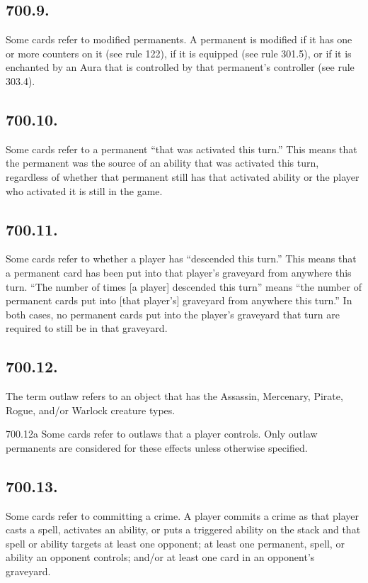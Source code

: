 \subsection*{700.9.}
Some cards refer to modified permanents. A permanent is modified if it has one or more counters on it (see rule 122), if it is equipped (see rule 301.5), or if it is enchanted by an Aura that is controlled by that permanent’s controller (see rule 303.4).

\subsection*{700.10.}
Some cards refer to a permanent “that was activated this turn.” This means that the permanent was the source of an ability that was activated this turn, regardless of whether that permanent still has that activated ability or the player who activated it is still in the game.

\subsection*{700.11.}
Some cards refer to whether a player has “descended this turn.” This means that a permanent card has been put into that player’s graveyard from anywhere this turn. “The number of times [a player] descended this turn” means “the number of permanent cards put into [that player’s] graveyard from anywhere this turn.” In both cases, no permanent cards put into the player’s graveyard that turn are required to still be in that graveyard.

\subsection*{700.12.}
The term outlaw refers to an object that has the Assassin, Mercenary, Pirate, Rogue, and/or Warlock creature types.

700.12a Some cards refer to outlaws that a player controls. Only outlaw permanents are considered for these effects unless otherwise specified.

\subsection*{700.13.}
Some cards refer to committing a crime. A player commits a crime as that player casts a spell, activates an ability, or puts a triggered ability on the stack and that spell or ability targets at least one opponent; at least one permanent, spell, or ability an opponent controls; and/or at least one card in an opponent’s graveyard.

